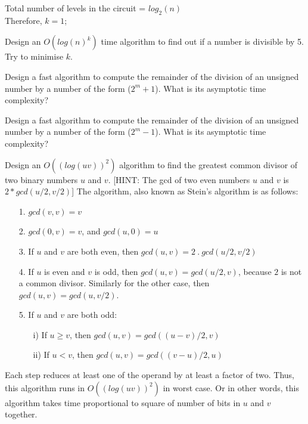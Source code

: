 \begin{ExerciseList}
\begin{center}
\end{center}

Total number of levels in the circuit = $log_2(n)$\\
Therefore, $k=1$;

\Exercise[difficulty=1]
Design an $O(log(n)^k)$ time algorithm to find out if a number is divisible by 5. Try to minimise $k$. 

\Exercise[difficulty=2]
Design a fast algorithm to compute the remainder of the division of an unsigned number
by a number of the form ($2^m + 1$). What is its asymptotic time complexity?

\Exercise[difficulty=2]
Design a fast algorithm to compute the remainder of the division of an unsigned number
by a number of the form ($2^m - 1$). What is its asymptotic time complexity?

\Exercise[difficulty=2]
Design an $O((log(uv))^2)$ algorithm to find the greatest common divisor of two binary numbers $u$ and $v$.
[HINT: The gcd of two even numbers $u$ and $v$ is $2*gcd(u/2,v/2)$]
\Answer
The algorithm, also known as Stein's algorithm is as follows:

\begin{enumerate}
	\item[1. ] $gcd (v, v) = v$
	\item[2. ] $gcd(0, v) = v$, and $gcd(u, 0) = u$ 
	\item[3. ] If $u$ and $v$ are both even, then $gcd(u, v) = 2\:.\:gcd(u/2, v/2)$
	\item[4. ] If $u$ is even and $v$ is odd, then $gcd(u, v) = gcd(u/2, v)$, because $2$ is not a common divisor. Similarly for the other case, then $gcd(u, v) = gcd(u, v/2)$.
	\item[5. ] If $u$ and $v$ are both odd:
	\begin{enumerate}
		\item[i) ] If $u \geq v$, then $gcd(u, v) = gcd((u - v)/2, v)$ 
		\item[ii) ] If $u < v$, then $gcd(u, v) = gcd((v - u)/2, u)$
	\end{enumerate}
\end{enumerate}
Each step reduces at least one of the operand by at least a factor of two.  Thus, this algorithm runs in
$O((log(uv))^2)$ in worst case. Or in other words, this algorithm takes time proportional to square of number of bits in
$u$ and $v$ together. 


\end{ExerciseList}

